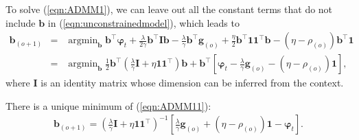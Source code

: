 \documentclass[twoside,11pt]{article}
\DeclareMathOperator*{\argmin}{argmin}
\begin{document}
To solve (\ref{eqn:ADMM1}), we can leave out all the constant terms that do not include $\mathbf{b}$ in (\ref{eqn:unconstrainedmodel}), which leads to
\begin{eqnarray}
\label{eqn:ADMM11}
\mathbf{b}_{(o+1)}&=&\argmin_{\mathbf{b}} \mathbf{b}^\top\bm{\varphi}_t+\frac{\lambda}{2\gamma}\mathbf{b}^\top\mathbf{I}\mathbf{b}-\frac{\lambda}{\gamma}\mathbf{b}^\top\mathbf{g}_{(o)}+\frac{\eta}{2}\mathbf{b}^\top\mathbf{1}\mathbf{1}^\top\mathbf{b}-(\eta-\rho_{(o)})\mathbf{b}^\top\mathbf{1}\nonumber\\
&=&\argmin_{\mathbf{b}}\frac{1}{2}\mathbf{b}^\top\left( \frac{\lambda}{\gamma}\mathbf{I}+\eta\mathbf{1}\mathbf{1}^\top \right)\mathbf{b}+\mathbf{b}^\top\left[  \bm{\varphi}_t-\frac{\lambda}{\gamma}\mathbf{g}_{(o)}-(\eta-\rho_{(o)})\mathbf{1}  \right],
\end{eqnarray}
where $\mathbf{I}$ is an identity matrix whose dimension can be inferred from the context.

\begin{proposition}
\label{prop:uniquemin}
There is a unique minimum of (\ref{eqn:ADMM11}):
\begin{eqnarray}
\label{eqn:uniquemin}
\mathbf{b}_{(o+1)}=\left( \frac{\lambda}{\gamma}\mathbf{I}+\eta\mathbf{1}\mathbf{1}^\top \right)^{-1}\left[  \frac{\lambda}{\gamma}\mathbf{g}_{(o)}+(\eta-\rho_{(o)})\mathbf{1}-\bm{\varphi}_t  \right].
\end{eqnarray}
\end{proposition}
\end{document}
